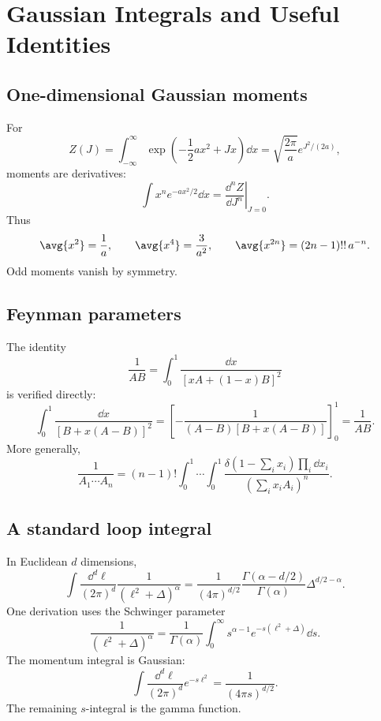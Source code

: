 \chapter{Gaussian Integrals and Useful Identities}

\section{One-dimensional Gaussian moments}

For
\[
  Z(J)=\int_{-\infty}^{\infty}
  \exp\left(-\frac12ax^2+Jx\right)\dd x
  =
  \sqrt{\frac{2\pi}{a}}e^{J^2/(2a)},
\]
moments are derivatives:
\[
  \int x^n e^{-ax^2/2}\dd x
  =
  \left.\frac{\dd^nZ}{\dd J^n}\right|_{J=0}.
\]
Thus
\[
  \avg{x^2}=\frac1a,\qquad
  \avg{x^4}=\frac3{a^2},\qquad
  \avg{x^{2n}}=(2n-1)!!\,a^{-n}.
\]
Odd moments vanish by symmetry.

\section{Feynman parameters}

The identity
\[
  \frac1{AB}=\int_0^1\frac{\dd x}{[xA+(1-x)B]^2}
\]
is verified directly:
\[
  \int_0^1\frac{\dd x}{[B+x(A-B)]^2}
  =
  \left[
  -\frac1{(A-B)[B+x(A-B)]}
  \right]_0^1
  =
  \frac1{AB}.
\]
More generally,
\[
  \frac1{A_1\cdots A_n}
  =
  (n-1)!
  \int_0^1\cdots\int_0^1
  \frac{\delta(1-\sum_i x_i)\prod_i\dd x_i}
  {(\sum_i x_iA_i)^n}.
\]

\section{A standard loop integral}

In Euclidean \(d\) dimensions,
\[
  \int\frac{\dd^d\ell}{(2\pi)^d}
  \frac1{(\ell^2+\Delta)^\alpha}
  =
  \frac1{(4\pi)^{d/2}}
  \frac{\Gamma(\alpha-d/2)}{\Gamma(\alpha)}
  \Delta^{d/2-\alpha}.
\]
One derivation uses the Schwinger parameter
\[
  \frac1{(\ell^2+\Delta)^\alpha}
  =
  \frac1{\Gamma(\alpha)}
  \int_0^\infty s^{\alpha-1}e^{-s(\ell^2+\Delta)}\dd s.
\]
The momentum integral is Gaussian:
\[
  \int\frac{\dd^d\ell}{(2\pi)^d}e^{-s\ell^2}
  =
  \frac1{(4\pi s)^{d/2}}.
\]
The remaining \(s\)-integral is the gamma function.

